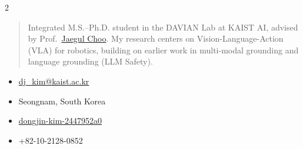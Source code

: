 \documentclass[10pt,a4paper,ragged2e,withhyper]{altacv}
\begin{document}


\makecvheader

\begin{paracol}{2}


\begin{quote}
Integrated M.S.–Ph.D. student in the DAVIAN Lab at KAIST AI, advised by Prof.\ \href{https://sites.google.com/site/jaegulchoo/}{Jaegul Choo}. My research centers on Vision-Language-Action (VLA) for robotics, building on earlier work in multi-modal grounding and language grounding (LLM Safety).
\end{quote}

\begin{itemize}[leftmargin=*,nosep]
  \item \faEnvelope\enspace \href{mailto:dj_kim@kaist.ac.kr}{dj\_kim@kaist.ac.kr}
  \item \faMapMarker\enspace Seongnam, South Korea
  \item \faLinkedin\enspace \href{https://www.linkedin.com/in/dongjin-kim-2447952a0/}{dongjin-kim-2447952a0}
  \item \faPhone\enspace +82-10-2128-0852
\end{itemize}

\medskip


\medskip


\switchcolumn



\end{paracol}
\end{document}
